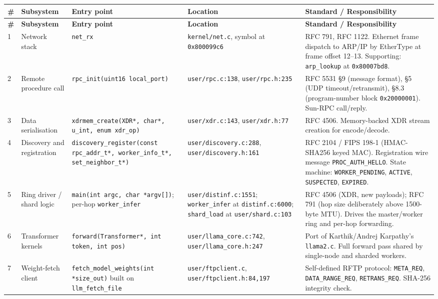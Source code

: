 \documentclass[11pt,a4paper]{article}
\begin{document}
\begin{longtable}{@{}p{0.4cm}p{3.1cm}p{3.2cm}p{3.6cm}p{4.5cm}@{}}
\toprule
\textbf{\#} & \textbf{Subsystem} & \textbf{Entry point} & \textbf{Location} & \textbf{Standard / Responsibility} \\
\midrule
\endfirsthead
\toprule
\textbf{\#} & \textbf{Subsystem} & \textbf{Entry point} & \textbf{Location} & \textbf{Standard / Responsibility} \\
\midrule
\endhead
1 & Network stack & \texttt{net\_rx} & \texttt{kernel/net.c}, symbol at \texttt{0x800099c6} & RFC 791, RFC 1122. Ethernet frame dispatch to ARP/IP by EtherType at frame offset 12--13. Supporting: \texttt{arp\_lookup} at \texttt{0x80007bd8}. \\
2 & Remote procedure call & \texttt{rpc\_init(uint16 local\_port)} & \texttt{user/rpc.c:138}, \texttt{user/rpc.h:235} & RFC 5531 \S9 (message format), \S5 (UDP timeout/retransmit), \S8.3 (program-number block \texttt{0x20000001}). Sun-RPC call/reply. \\
3 & Data serialisation & \texttt{xdrmem\_create(XDR*, char*, u\_int, enum xdr\_op)} & \texttt{user/xdr.c:143}, \texttt{user/xdr.h:77} & RFC 4506. Memory-backed XDR stream creation for encode/decode. \\
4 & Discovery and registration & \texttt{discovery\_register(const rpc\_addr\_t*, worker\_info\_t*, set\_neighbor\_t*)} & \texttt{user/discovery.c:288}, \texttt{user/discovery.h:161} & RFC 2104 / FIPS 198-1 (HMAC-SHA256 keyed MAC). Registration wire message \texttt{PROC\_AUTH\_HELLO}. State machine: \texttt{WORKER\_PENDING}, \texttt{ACTIVE}, \texttt{SUSPECTED}, \texttt{EXPIRED}. \\
5 & Ring driver / shard logic & \texttt{main(int argc, char *argv[])}; per-hop \texttt{worker\_infer} & \texttt{user/distinf.c:1551}; \texttt{worker\_infer} at \texttt{distinf.c:6000}; \texttt{shard\_load} at \texttt{user/shard.c:103} & RFC 4506 (XDR, new payloads); RFC 791 (hop size deliberately above 1500-byte MTU). Drives the master/worker ring and per-hop forwarding. \\
6 & Transformer kernels & \texttt{forward(Transformer*, int token, int pos)} & \texttt{user/llama\_core.c:742}, \texttt{user/llama\_core.h:247} & Port of Karthik/Andrej Karpathy's \texttt{llama2.c}. Full forward pass shared by single-node and sharded workers. \\
7 & Weight-fetch client & \texttt{fetch\_model\_weights(int *size\_out)} built on \texttt{llm\_fetch\_file} & \texttt{user/ftpclient.c}, \texttt{user/ftpclient.h:84,197} & Self-defined RFTP protocol: \texttt{META\_REQ}, \texttt{DATA\_RANGE\_REQ}, \texttt{RETRANS\_REQ}. SHA-256 integrity check. \\

\end{longtable}
\end{document}
